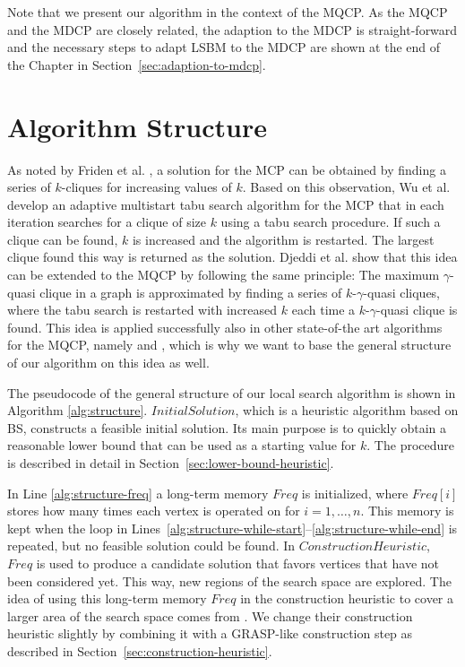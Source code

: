 \documentclass[draft,final]{vutinfth} %
\begin{document}
Note that we present our algorithm in the context of the MQCP. As the MQCP and the MDCP are closely related, the adaption to the MDCP is straight-forward and the necessary steps to adapt LSBM to the MDCP are shown at the end of the Chapter in Section~\ref{sec:adaption-to-mdcp}. 

\section{Algorithm Structure} \label{sec:algorithm-structure}

As noted by Friden et al. \cite{Friden1989}, a solution for the MCP can be obtained by finding a series of $k$-cliques for increasing values of $k$. Based on this observation, Wu et al. \cite{WuH13} develop an adaptive multistart tabu search algorithm for the MCP that in each iteration searches for a clique of size $k$ using a tabu search procedure. If such a clique can be found, $k$ is increased and the algorithm is restarted. The largest clique found this way is returned as the solution. Djeddi et al. \cite{djeddi_extension_2019} show that this idea can be extended to the MQCP by following the same principle: The maximum $\gamma$-quasi clique in a graph is approximated by finding a series of $k$-$\gamma$-quasi cliques, where the tabu search is restarted with increased $k$ each time a $k$-$\gamma$-quasi clique is found. This idea is applied successfully also in other state-of-the art algorithms for the MQCP, namely \cite{zhou_opposition-based_2020} and \cite{chen_nuqclq_2021}, which is why we want to base the general structure of our algorithm on this idea as well. 

The pseudocode of the general structure of our local search algorithm is shown in Algorithm \ref{alg:structure}.
$\mathit{InitialSolution}$, which is a heuristic algorithm based on BS, constructs a feasible initial solution. Its main purpose is to quickly obtain a reasonable lower bound that can be used as a starting value for $k$. The procedure is described in detail in Section~\ref{sec:lower-bound-heuristic}.

In Line \ref{alg:structure-freq} a long-term memory $\mathit{Freq}$ is initialized, where $\mathit{Freq[i]}$ stores how many times each vertex is operated on for $i=1,\dots,n$. This memory is kept when the loop in Lines~\ref{alg:structure-while-start}--\ref{alg:structure-while-end} is repeated, but no feasible solution could be found. In $\mathit{ConstructionHeuristic}$, $\mathit{Freq}$ is used to produce a candidate solution that favors vertices that have not been considered yet. This way, new regions of the search space are explored. The idea of using this long-term memory $\mathit{Freq}$ in the construction heuristic to cover a larger area of the search space comes from \cite{chen_nuqclq_2021}. We change their construction heuristic slightly by combining it with a GRASP-like construction step as described in Section~\ref{sec:construction-heuristic}. 
\end{document}
